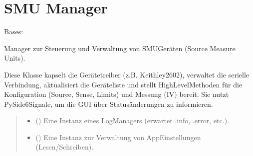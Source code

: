 \documentclass[letterpaper,10pt,english]{sphinxmanual}
\begin{document}
\sphinxstepscope


\chapter{SMU Manager}
\label{\detokenize{modulab/smu_manager:module-modules.smu.SmuManager}}\label{\detokenize{modulab/smu_manager:id1}}\label{\detokenize{modulab/smu_manager:smu-manager}}\label{\detokenize{modulab/smu_manager::doc}}

\begin{fulllineitems}
\label{\detokenize{modulab/smu_manager:modules.smu.SmuManager.SmuManager}}
\pysigstartsignatures
\pysiglinewithargsret
{}
{\sphinxparamcomma {}}
{}
\pysigstopsignatures
\sphinxAtStartPar
Bases: 

\sphinxAtStartPar
Manager zur Steuerung und Verwaltung von SMU\sphinxhyphen{}Geräten (Source Measure Units).

\sphinxAtStartPar
Diese Klasse kapselt die Gerätetreiber (z.B. Keithley2602), verwaltet die
serielle Verbindung, aktualisiert die Geräteliste und stellt High\sphinxhyphen{}Level\sphinxhyphen{}Methoden
für die Konfiguration (Source, Sense, Limits) und Messung (IV) bereit.
Sie nutzt PySide6\sphinxhyphen{}Signale, um die GUI über Statusänderungen zu informieren.
\begin{quote}\begin{description}
\begin{itemize}
\item {} 
\sphinxAtStartPar
{} () \textendash{} Eine Instanz eines Log\sphinxhyphen{}Managers (erwartet .info, .error, etc.).

\item {} 
\sphinxAtStartPar
{} () \textendash{} Eine Instanz zur Verwaltung von
App\sphinxhyphen{}Einstellungen (Lesen/Schreiben).


\end{itemize}
\end{description}
\end{quote}
\end{fulllineitems}
\end{document}
